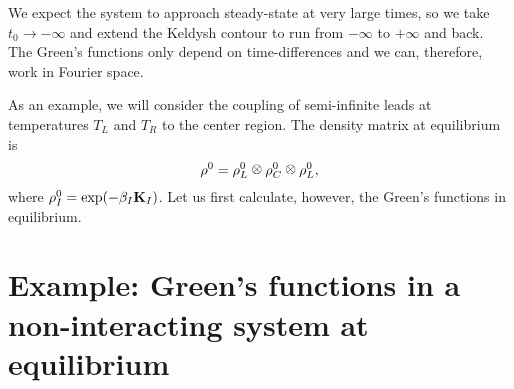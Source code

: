 We expect the system to approach steady-state at very large times, so we take $t_0\to -\infty$ and extend the Keldysh contour to run from $-\infty$ to $+\infty$ and back. The Green's functions only depend on time-differences and we can, therefore, work in Fourier space.

As an example, we will consider the coupling of semi-infinite leads at temperatures $T_L$ and $T_R$ to the center region. The density matrix at equilibrium is
\begin{equation}
 \rho^0 = \rho^0_L \kronecker \rho^0_C \kronecker \rho^0_L, 
\end{equation}
where $\rho^0_I=\exp(-\beta_I \mathbf{K}_I)$.  Let us first calculate, however, the Green's functions in equilibrium.

\section{Example: Green's functions in a non-interacting system at equilibrium}

